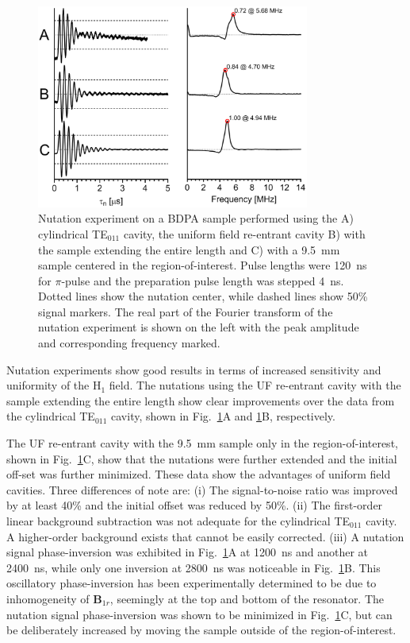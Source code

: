 \begin{figure}[htb]\centering
 \includegraphics[width=0.8\textwidth]{Kapitel/Ch2-Images/06a-Nutation.eps}
 \caption[Nutation experiment comparison.]{Nutation experiment on a BDPA sample performed using the A) cylindrical TE$_{011}$ cavity, the uniform field re-entrant \cylTE{} cavity B) with the sample extending the entire length and C) with a 9.5~mm sample centered in the region-of-interest. Pulse lengths were 120~ns for $\pi$-pulse and the preparation pulse length was stepped 4~ns. Dotted lines show the nutation center, while dashed lines show 50\% signal markers. The real part of the Fourier transform of the nutation experiment is shown on the left with the peak amplitude and corresponding frequency marked.}
 \label{Ch2-fig:nutation}
\end{figure}

Nutation experiments show good results in terms of increased sensitivity and uniformity of the H$_1$ field. The nutations using the UF re-entrant \cylTE{} cavity with the sample extending the entire length show clear improvements over the data from the cylindrical TE$_{011}$ cavity, shown in Fig.~\ref{Ch2-fig:nutation}A and \ref{Ch2-fig:nutation}B, respectively. 

The UF re-entrant \cylTE{} cavity with the 9.5~mm sample only in the region-of-interest, shown in Fig.~\ref{Ch2-fig:nutation}C, show that the nutations were further extended and the initial off-set was further minimized. These data show the advantages of uniform field cavities. Three differences of note are: (i) The signal-to-noise ratio was improved by at least 40\% and the initial offset was reduced by 50\%. (ii) The first-order linear background subtraction was not adequate for the cylindrical TE$_{011}$ cavity. A higher-order background exists that cannot be easily corrected. (iii) A nutation signal phase-inversion was exhibited in  Fig.~\ref{Ch2-fig:nutation}A at 1200~ns and another at 2400~ns, while only one inversion at 2800~ns was noticeable in Fig.~\ref{Ch2-fig:nutation}B. This oscillatory phase-inversion has been experimentally determined to be due to inhomogeneity of $\mathbf{B}_{1r}$, seemingly at the top and bottom of the resonator. The nutation signal phase-inversion was shown to be minimized in Fig.~\ref{Ch2-fig:nutation}C, but can be deliberately increased by moving the sample outside of the region-of-interest.

